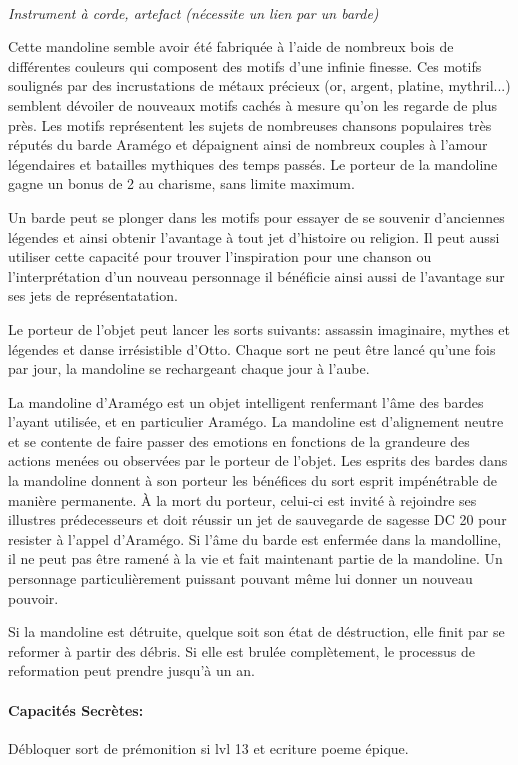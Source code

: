 \\
{\small \it Instrument à corde, artefact (nécessite un lien par
un barde)}\\
\label{MandolineAramego}

Cette mandoline semble avoir été fabriquée à l'aide de nombreux bois de 
différentes couleurs qui composent des motifs d'une infinie finesse. Ces
motifs soulignés par des incrustations de métaux précieux (or, argent,
platine, mythril...) semblent dévoiler de nouveaux motifs cachés à mesure
qu'on les regarde de plus près. Les motifs représentent les sujets
de nombreuses chansons populaires très réputés du barde Aramégo et 
dépaignent ainsi de nombreux couples à l'amour légendaires et batailles
mythiques des temps passés. Le porteur de la mandoline gagne un bonus de
2 au charisme, sans limite maximum. 

Un barde peut se plonger dans les motifs pour essayer de se souvenir 
d'anciennes légendes et ainsi obtenir l'avantage à tout jet d'histoire
ou religion. Il peut aussi utiliser cette capacité pour trouver 
l'inspiration pour une chanson ou l'interprétation d'un nouveau
personnage il bénéficie ainsi aussi de l'avantage sur ses jets de 
représentatation.

Le porteur de l'objet peut lancer les sorts suivants: assassin 
imaginaire, mythes et légendes et danse irrésistible d'Otto. Chaque
sort ne peut être lancé qu'une fois par jour, la mandoline se rechargeant 
chaque jour à l'aube.

La mandoline d'Aramégo est un objet intelligent renfermant l'âme des
bardes l'ayant utilisée, et en particulier Aramégo. La 
mandoline est d'alignement neutre et se contente de faire 
passer des emotions en fonctions de la grandeure des actions menées
ou observées par le porteur de l'objet. Les esprits des bardes dans la mandoline
donnent à son porteur les bénéfices du sort esprit impénétrable de 
manière permanente. À la mort du porteur, celui-ci 
est invité à rejoindre ses illustres prédecesseurs et doit réussir un 
jet de sauvegarde de sagesse DC 20 pour resister à l'appel d'Aramégo.
Si l'âme du barde est enfermée dans la mandolline, il ne peut pas être
ramené à la vie et fait maintenant partie de la mandoline. Un personnage 
particulièrement puissant pouvant même lui donner un nouveau pouvoir.

Si la mandoline est détruite, quelque soit son état de déstruction, elle 
finit par se reformer à partir des débris. Si elle est brulée complètement, 
le processus de reformation peut prendre jusqu'à un an.

\paragraph{Capacités Secrètes:}

Débloquer sort de prémonition si lvl 13 et ecriture poeme épique.
